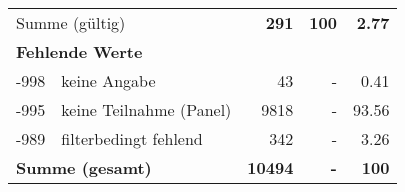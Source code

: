 \begin{longtable}{lXrrr}
     \midrule
     \multicolumn{2}{l}{Summe (gültig)} &
       \textbf{\num{291}} &
     \textbf{100} &
       \textbf{\num[round-mode=places,round-precision=2]{2,77}} \\
     \multicolumn{5}{l}{\textbf{Fehlende Werte}}\\
       -998 &
       keine Angabe &
         \num{43} &
        - &
         \num[round-mode=places,round-precision=2]{0,41} \\
       -995 &
       keine Teilnahme (Panel) &
         \num{9818} &
        - &
         \num[round-mode=places,round-precision=2]{93,56} \\
       -989 &
       filterbedingt fehlend &
         \num{342} &
        - &
         \num[round-mode=places,round-precision=2]{3,26} \\
     \midrule
     \multicolumn{2}{l}{\textbf{Summe (gesamt)}} &
          \textbf{\num{10494}} &
        \textbf{-} &
        \textbf{100} \\
     \bottomrule
     \end{longtable}
     
